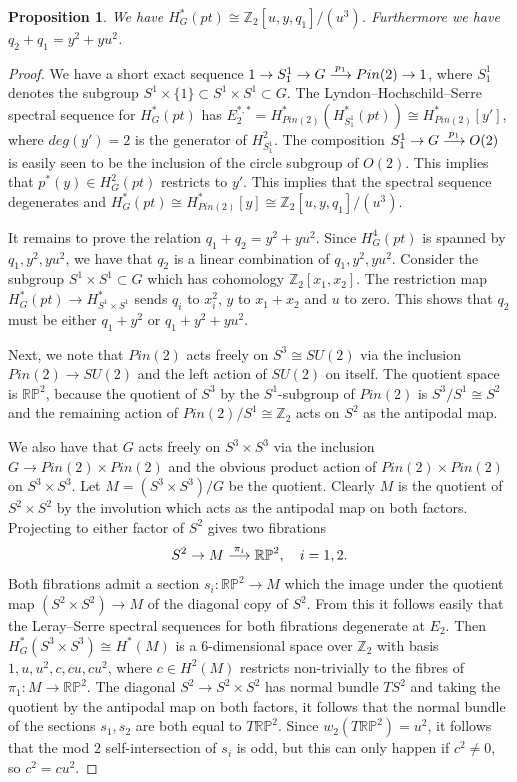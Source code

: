 \documentclass[10pt,a4paper]{amsart}
\newtheorem{proposition}[theorem]{Proposition}
\begin{document}
\begin{proposition}\label{prop:q12}
We have $H^*_G(pt) \cong \mathbb{Z}_2[u,y,q_1]/(u^3)$. Furthermore we have $q_2 + q_1 = y^2 + yu^2$.
\end{proposition}

\begin{proof}
We have a short exact sequence $1 \to S^1_1 \to G \buildrel p_1 \over \longrightarrow Pin(2) \to 1$, where $S^1_1$ denotes the subgroup $S^1 \times \{1\} \subset S^1 \times S^1 \subset G$. The Lyndon--Hochschild--Serre spectral sequence for $H^*_G(pt)$ has $E_2^{*,*} = H^*_{Pin(2)}( H^*_{S^1_1}(pt) ) \cong H^*_{Pin(2)}[y']$, where $deg(y') = 2$ is the generator of $H^2_{S^1_1}$. The composition $S^1_1 \to G \buildrel p_1 \over \longrightarrow O(2)$ is easily seen to be the inclusion of the circle subgroup of $O(2)$. This implies that $p^*(y) \in H^2_G(pt)$ restricts to $y'$. This implies that the spectral sequence degenerates and $H^*_G(pt) \cong H^*_{Pin(2)}[y] \cong \mathbb{Z}_2[u,y,q_1]/(u^3)$.

It remains to prove the relation $q_1 + q_2 = y^2 + yu^2$. Since $H^4_{G}(pt)$ is spanned by $q_1,y^2,yu^2$, we have that $q_2$ is a linear combination of $q_1, y^2, yu^2$. Consider the subgroup $S^1 \times S^1 \subset G$ which has cohomology $\mathbb{Z}_2[x_1,x_2]$. The restriction map $H^*_{G}(pt) \to H^*_{S^1 \times S^1}$ sends $q_i$ to $x_i^2$, $y$ to $x_1+x_2$ and $u$ to zero. This shows that $q_2$ must be either $q_1 + y^2$ or $q_1 + y^2 + yu^2$. 

Next, we note that $Pin(2)$ acts freely on $S^3 \cong SU(2)$ via the inclusion $Pin(2) \to SU(2)$ and the left action of $SU(2)$ on itself. The quotient space is $\mathbb{RP}^2$, because the quotient of $S^3$ by the $S^1$-subgroup of $Pin(2)$ is $S^3/S^1 \cong S^2$ and the remaining action of $Pin(2)/S^1 \cong \mathbb{Z}_2$ acts on $S^2$ as the antipodal map.

We also have that $G$ acts freely on $S^3 \times S^3$ via the inclusion $G \to Pin(2) \times Pin(2)$ and the obvious product action of $Pin(2) \times Pin(2)$ on $S^3 \times S^3$. Let $M = (S^3 \times S^3)/G$ be the quotient. Clearly $M$ is the quotient of $S^2 \times S^2$ by the involution which acts as the antipodal map on both factors. Projecting to either factor of $S^2$ gives two fibrations
\[
S^2 \to M \buildrel \pi_i \over \longrightarrow \mathbb{RP}^2, \quad i = 1,2.
\]
Both fibrations admit a section $s_i : \mathbb{RP}^2 \to M$ which the image under the quotient map $(S^2 \times S^2) \to M$ of the diagonal copy of $S^2$. From this it follows easily that the Leray--Serre spectral sequences for both fibrations degenerate at $E_2$. Then $H^*_G( S^3 \times S^3) \cong H^*(M)$ is a $6$-dimensional space over $\mathbb{Z}_2$ with basis $1,u,u^2,c,cu,cu^2$, where $c \in H^2(M)$ restricts non-trivially to the fibres of $\pi_1 : M \to \mathbb{RP}^2$. The diagonal $S^2 \to S^2 \times S^2$ has normal bundle $TS^2$ and taking the quotient by the antipodal map on both factors, it follows that the normal bundle of the sections $s_1,s_2$ are both equal to $T\mathbb{RP}^2$. Since $w_2( T\mathbb{RP}^2) = u^2$, it follows that the mod $2$ self-intersection of $s_i$ is odd, but this can only happen if $c^2 \neq 0$, so $c^2 = cu^2$.


\end{proof}
\end{document}
